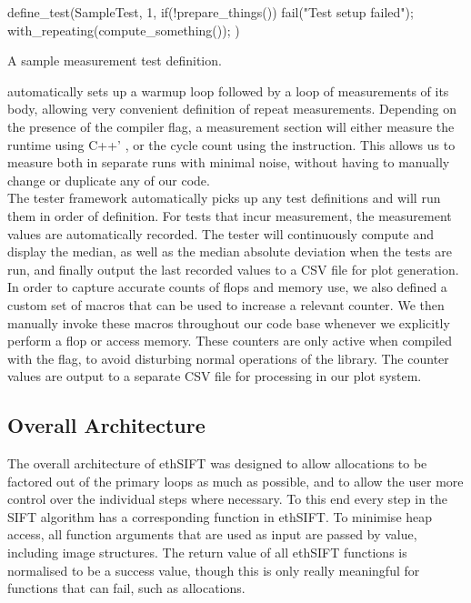 \documentclass[letterpaper]{article}
\begin{document}
\begin{listing}[ht]
\begin{ccode}
define_test(SampleTest, 1, {
    if(!prepare_things())
      fail("Test setup failed");
    with_repeating(compute_something());
  })
\end{ccode}
\caption{A sample measurement test definition.}
\label{lst:sample-test}
\end{listing}

 automatically sets up a warmup loop followed by a loop of measurements of its body, allowing very convenient definition of repeat measurements. Depending on the presence of the  compiler flag, a measurement section will either measure the runtime using C++' , or the cycle count using the  instruction. This allows us to measure both in separate runs with minimal noise, without having to manually change or duplicate any of our code. \\

The tester framework automatically picks up any test definitions and will run them in order of definition. For tests that incur measurement, the measurement values are automatically recorded. The tester will continuously compute and display the median, as well as the median absolute deviation when the tests are run, and finally output the last recorded values to a CSV file for plot generation. \\

In order to capture accurate counts of flops and memory use, we also defined a custom set of macros that can be used to increase a relevant counter. We then manually invoke these macros throughout our code base whenever we explicitly perform a flop or access memory. These counters are only active when compiled with the  flag, to avoid disturbing normal operations of the library. The counter values are output to a separate CSV file for processing in our plot system.

\subsection*{Overall Architecture}\label{sec:architecture}
The overall architecture of ethSIFT was designed to allow allocations to be factored out of the primary loops as much as possible, and to allow the user more control over the individual steps where necessary. To this end every step in the SIFT algorithm has a corresponding function in ethSIFT. To minimise heap access, all function arguments that are used as input are passed by value, including image structures. The return value of all ethSIFT functions is normalised to be a success value, though this is only really meaningful for functions that can fail, such as allocations. \\
\end{document}
